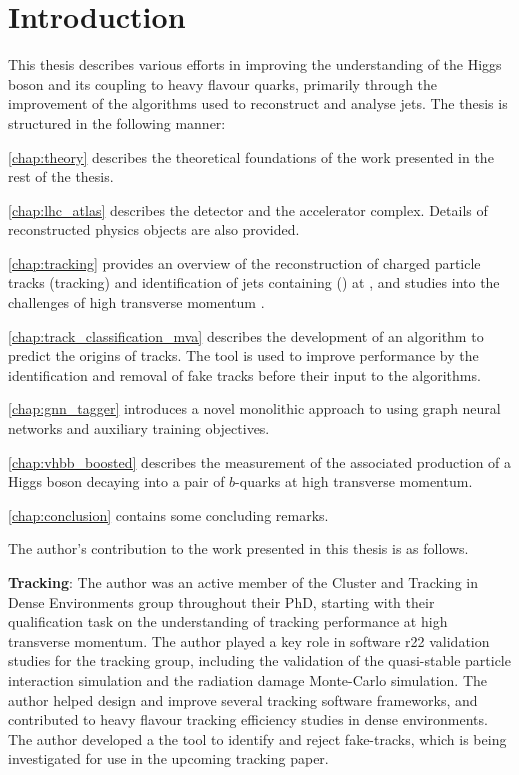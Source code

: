 \chapter{Introduction}\label{chap:intro}


This thesis describes various efforts in improving the understanding of the Higgs boson and its coupling to heavy flavour quarks, primarily through the improvement of the algorithms used to reconstruct and analyse jets.
The thesis is structured in the following manner:

\cref{chap:theory} describes the theoretical foundations of the work presented in the rest of the thesis.

\cref{chap:lhc_atlas} describes the \ATLAS detector and the \CERN accelerator complex. Details of reconstructed physics objects are also provided.

\cref{chap:tracking} provides an overview of the reconstruction of charged particle tracks (tracking) and identification of jets containing \bhadrons (\btagging) at \ATLAS, and studies into the challenges of high transverse momentum \btagging.

\cref{chap:track_classification_mva} describes the development of an algorithm to predict the origins of tracks. The tool is used to improve \btagging performance by the identification and removal of fake tracks before their input to the \btagging algorithms.

\cref{chap:gnn_tagger} introduces a novel monolithic approach to \btagging using graph neural networks and auxiliary training objectives.

\cref{chap:vhbb_boosted} describes the measurement of the associated production of a Higgs boson decaying into a pair of $b$-quarks at high transverse momentum.

\cref{chap:conclusion} contains some concluding remarks.


\clearpage

The author's contribution to the work presented in this thesis is as follows.

\textbf{Tracking}:
The author was an active member of the Cluster and Tracking in Dense Environments group throughout their PhD, starting with their qualification task on the understanding of tracking performance at high transverse momentum.
The author played a key role in software r22 validation studies for the tracking group, including the validation of the quasi-stable particle interaction simulation and the radiation damage Monte-Carlo simulation. 
The author helped design and improve several tracking software frameworks, and contributed to heavy flavour tracking efficiency studies in dense environments.
The author developed a the tool to identify and reject fake-tracks, which is being investigated for use in the upcoming tracking paper.

